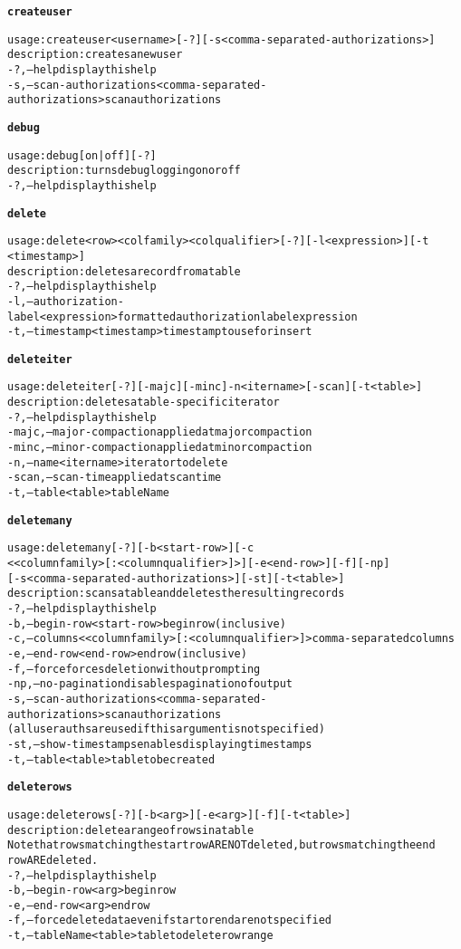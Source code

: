 \begin{alltt}
\textbf{createuser}

    usage: createuser <username> [-?] [-s <comma-separated-authorizations>]
    description: creates a new user
      -?,--help  display this help
      -s,--scan-authorizations <comma-separated-authorizations>  scan authorizations

\textbf{debug}

    usage: debug [ on | off ] [-?]
    description: turns debug logging on or off
      -?,--help  display this help

\textbf{delete}

    usage: delete <row> <colfamily> <colqualifier> [-?] [-l <expression>] [-t
    	      <timestamp>]
    description: deletes a record from a table
      -?,--help  display this help
      -l,--authorization-label <expression>  formatted authorization label expression
      -t,--timestamp <timestamp>  timestamp to use for insert

\textbf{deleteiter}

    usage: deleteiter [-?] [-majc] [-minc] -n <itername> [-scan] [-t <table>]
    description: deletes a table-specific iterator
      -?,--help  display this help
      -majc,--major-compaction  applied at major compaction
      -minc,--minor-compaction  applied at minor compaction
      -n,--name <itername>	iterator to delete
      -scan,--scan-time  applied at scan time
      -t,--table <table>  tableName

\textbf{deletemany}

    usage: deletemany [-?] [-b <start-row>] [-c
    	      <{<columnfamily>[:<columnqualifier>]}>] [-e <end-row>] [-f] [-np]
    	      [-s <comma-separated-authorizations>] [-st] [-t <table>]
    description: scans a table and deletes the resulting records
      -?,--help  display this help
      -b,--begin-row <start-row>  begin row (inclusive)
      -c,--columns <{<columnfamily>[:<columnqualifier>]}>  comma-separated columns
      -e,--end-row <end-row>  end row (inclusive)
      -f,--force  forces deletion without prompting
      -np,--no-pagination  disables pagination of output
      -s,--scan-authorizations <comma-separated-authorizations>  scan authorizations
    	      (all user auths are used if this argument is not specified)
      -st,--show-timestamps  enables displaying timestamps
      -t,--table <table>  table to be created

\textbf{deleterows}

    usage: deleterows [-?] [-b <arg>] [-e <arg>] [-f] [-t <table>]
    description: delete a range of rows in a table
    Note that rows matching the start row ARE NOT deleted, but rows matching the end
    	      row ARE deleted.
      -?,--help  display this help
      -b,--begin-row <arg>	begin row
      -e,--end-row <arg>  end row
      -f,--force  delete data even if start or end are not specified
      -t,--tableName <table>  table to delete row range


\end{alltt}
